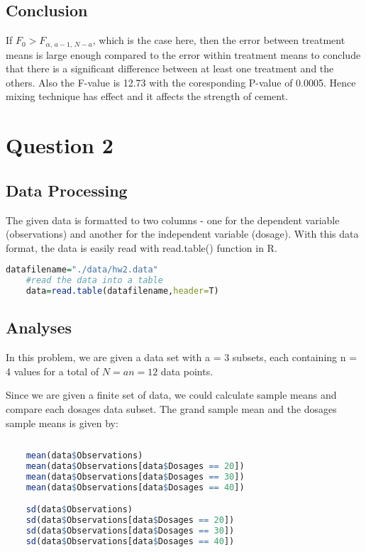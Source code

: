 \documentclass[11pt]{article}
\begin{document}
\subsection{Conclusion}
If $\displaystyle F_{0}>F_{\alpha ,\,a-1,\,N-a}$, which is the case here, then the error between treatment means is large enough compared to the error within treatment means to conclude that there is a significant difference between at least one treatment and the others. Also the F-value is 12.73 with the coresponding P-value of 0.0005. Hence mixing technique has effect and it affects the strength of cement.


\section{Question 2}

\subsection{Data Processing}
The given data is formatted to two columns - one for the dependent variable (observations) and another for the independent variable (dosage). With this data format, the data is easily read with read.table() function in R.

\begin{lstlisting}[language=R]
    datafilename="./data/hw2.data"
    #read the data into a table
    data=read.table(datafilename,header=T)
\end{lstlisting}


\subsection{Analyses}
In this problem, we are given a data set with a = 3 subsets, each containing n = 4 values for a total of $\displaystyle N=an=12$ data points. 

Since we are given a finite set of data, we could calculate sample means and compare each dosages data subset. The grand sample mean and the dosages sample means is given by: 

\begin{lstlisting}[language=R]
    
    mean(data$Observations)
    mean(data$Observations[data$Dosages == 20])
    mean(data$Observations[data$Dosages == 30])
    mean(data$Observations[data$Dosages == 40])

    sd(data$Observations)
    sd(data$Observations[data$Dosages == 20])
    sd(data$Observations[data$Dosages == 30])
    sd(data$Observations[data$Dosages == 40])


\end{lstlisting}
\end{document}
